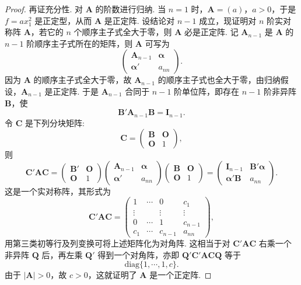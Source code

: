 \documentclass[../../main.tex]{subfiles}%
\begin{document}
\begin{proof}
再证充分性. 对 $\boldsymbol{A}$ 的阶数进行归纳. 当 $n = 1$ 时，$\boldsymbol{A}=(a)$，$a>0$，于是 $f = ax_1^2$ 是正定型，从而 $\boldsymbol{A}$ 是正定阵. 设结论对 $n - 1$ 成立，现证明对 $n$ 阶实对称阵 $\boldsymbol{A}$，若它的 $n$ 个顺序主子式全大于零，则 $\boldsymbol{A}$ 必是正定阵. 记 $\boldsymbol{A}_{n - 1}$ 是 $\boldsymbol{A}$ 的 $n - 1$ 阶顺序主子式所在的矩阵，则 $\boldsymbol{A}$ 可写为
\[
\begin{pmatrix}
\boldsymbol{A}_{n - 1} & \boldsymbol{\alpha}\\
\boldsymbol{\alpha}' & a_{nn}
\end{pmatrix}.
\]
因为 $\boldsymbol{A}$ 的顺序主子式全大于零，故 $\boldsymbol{A}_{n - 1}$ 的顺序主子式也全大于零，由归纳假设，$\boldsymbol{A}_{n - 1}$ 是正定阵. 于是 $\boldsymbol{A}_{n - 1}$ 合同于 $n - 1$ 阶单位阵，即存在 $n - 1$ 阶非异阵 $\boldsymbol{B}$，使
\[
\boldsymbol{B}'\boldsymbol{A}_{n - 1}\boldsymbol{B}=\boldsymbol{I}_{n - 1}.
\]
令 $\boldsymbol{C}$ 是下列分块矩阵:
\[
\boldsymbol{C}=\begin{pmatrix}
\boldsymbol{B} & \boldsymbol{O}\\
\boldsymbol{O} & 1
\end{pmatrix},
\]
则
\[
\boldsymbol{C}'\boldsymbol{A}\boldsymbol{C}=\begin{pmatrix}
\boldsymbol{B}' & \boldsymbol{O}\\
\boldsymbol{O} & 1
\end{pmatrix}
\begin{pmatrix}
\boldsymbol{A}_{n - 1} & \boldsymbol{\alpha}\\
\boldsymbol{\alpha}' & a_{nn}
\end{pmatrix}
\begin{pmatrix}
\boldsymbol{B} & \boldsymbol{O}\\
\boldsymbol{O} & 1
\end{pmatrix}=
\begin{pmatrix}
\boldsymbol{I}_{n - 1} & \boldsymbol{B}'\boldsymbol{\alpha}\\
\boldsymbol{\alpha}'\boldsymbol{B} & a_{nn}
\end{pmatrix}.
\]
这是一个实对称阵，其形式为
\[
\boldsymbol{C}'\boldsymbol{A}\boldsymbol{C}=\begin{pmatrix}
1 & \cdots & 0 & c_1\\
\vdots & & \vdots & \vdots\\
0 & \cdots & 1 & c_{n - 1}\\
c_1 & \cdots & c_{n - 1} & a_{nn}
\end{pmatrix},
\]
用第三类初等行及列变换可将上述矩阵化为对角阵. 这相当于对 $\boldsymbol{C}'\boldsymbol{A}\boldsymbol{C}$ 右乘一个非异阵 $\boldsymbol{Q}$ 后，再左乘 $\boldsymbol{Q}'$ 得到一个对角阵，亦即 $\boldsymbol{Q}'\boldsymbol{C}'\boldsymbol{A}\boldsymbol{C}\boldsymbol{Q}$ 等于
\[
\mathrm{diag}\{1,\cdots,1,c\}.
\]
由于 $|\boldsymbol{A}|>0$，故 $c>0$，这就证明了 $\boldsymbol{A}$ 是一个正定阵. 
\end{proof}
\end{document}
